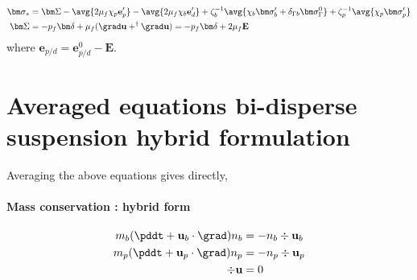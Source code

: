 \begin{align}
    \bm\sigma_* &= 
    \bm\Sigma 
    - \avg{2\mu_f \chi_{p} \textbf{e}_p'}- \avg{2\mu_f \chi_{b} \textbf{e}_d'}
    +\zeta_b^{-1} \avg{\chi_b \bm\sigma_b' + \delta_{\Gamma b} \bm\sigma_\Gamma^0}  
    +\zeta_p^{-1} \avg{\chi_p \bm\sigma_p'} \\
    \bm\Sigma
    &=
    -p_f\bm\delta
    + \mu_f (\grad \textbf{u} + ^\dagger\grad \textbf{u})
    =
    -p_f\bm\delta
    +2 \mu_f \textbf{E}
\end{align}
where $\textbf{e}_{p/d} = \textbf{e}_{p/d}^0 - \textbf{E}$. 


\section{Averaged equations bi-disperse suspension hybrid formulation}

Averaging the above equations gives directly, 
\paragraph*{Mass conservation : hybrid form}
\begin{align}
    m_b (\pddt + \textbf{u}_b \cdot \grad )n_b &= - n_b \div \textbf{u}_b\\
    m_p (\pddt + \textbf{u}_p \cdot \grad )n_p &= - n_p \div \textbf{u}_p\\
    \div \textbf{u}
    &= 
    0
\end{align}
